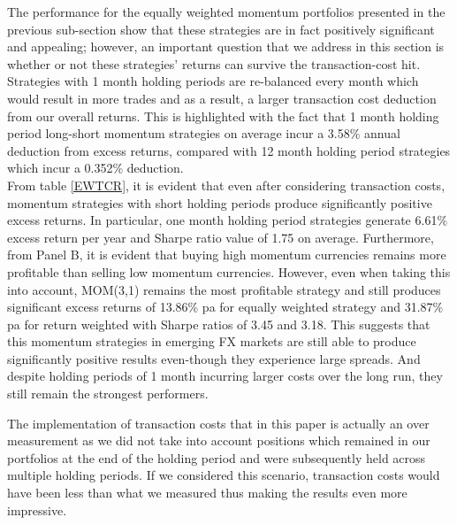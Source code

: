 \documentclass{article}
\begin{document}
The performance for the equally weighted momentum portfolios presented in the previous sub-section show that these strategies are in fact positively significant and appealing; however, an important question that we address in this section is whether or not these strategies' returns can survive the transaction-cost hit.\\

Strategies with 1 month holding periods are re-balanced every month which would result in more trades and as a result, a larger transaction cost deduction from our overall returns. This is highlighted with the fact that 1 month holding period long-short momentum strategies on average incur a 3.58\% annual deduction from excess returns, compared with 12 month holding period strategies which incur a 0.352\% deduction.\\

From table \ref{EWTCR}, it is evident that even after considering transaction costs, momentum strategies with short holding periods produce significantly positive excess returns. In particular, one month holding period strategies generate 6.61\% excess return per year and Sharpe ratio value of 1.75 on average. Furthermore, from Panel B, it is evident that buying high momentum currencies remains more profitable than selling low momentum currencies.
However, even when taking this into account, MOM(3,1) remains the most profitable strategy and still produces significant excess returns of 13.86\% pa for equally weighted strategy and 31.87\% pa for return weighted with Sharpe ratios of 3.45 and 3.18. This suggests that this momentum strategies in emerging FX markets are still able to produce significantly positive results even-though they experience large spreads. And despite holding periods of 1 month incurring larger costs over the long run, they still remain the strongest performers.


The implementation of transaction costs that in this paper is actually an over measurement as we did not take into account positions which remained in our portfolios at the end of the holding period and were subsequently held across multiple holding periods. If we considered this scenario, transaction costs would have been less than what we measured thus making the results even more impressive.
\end{document}
